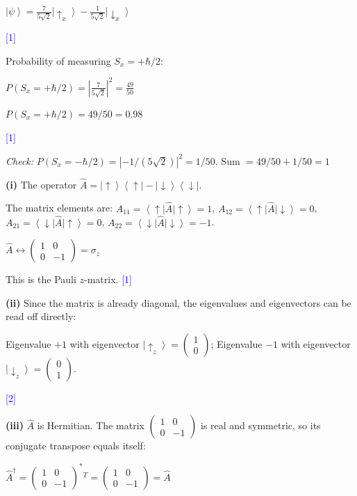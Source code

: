 \documentclass[12pt,a4paper]{article}
\newcommand{\markstep}[1]{\hfill\textcolor{blue}{[#1]}}
\newcommand{\finalanswer}[1]{%
  \begin{tcolorbox}[colback=green!5!white,colframe=green!50!black,boxrule=0.5pt]
  #1
  \end{tcolorbox}
}
\renewcommand{\ket}[1]{\left|#1\right\rangle}
\renewcommand{\bra}[1]{\left\langle #1\right|}
\renewcommand{\ketbra}[2]{\left|#1\right\rangle\!\left\langle #2\right|}
\begin{document}
\begin{parts}
\finalanswer{$\ket{\psi} = \frac{7}{5\sqrt{2}}\ket{\!\uparrow_x} - \frac{1}{5\sqrt{2}}\ket{\!\downarrow_x}$} \markstep{1}

Probability of measuring $S_x = +\hbar/2$:

$P(S_x = +\hbar/2) = \left|\frac{7}{5\sqrt{2}}\right|^2 = \frac{49}{50}$

\finalanswer{$P(S_x = +\hbar/2) = 49/50 = 0.98$} \markstep{1}

\textit{Check:} $P(S_x = -\hbar/2) = |{-1}/(5\sqrt{2})|^2 = 1/50$. Sum $= 49/50 + 1/50 = 1$ \checkmark

\item

\textbf{(i)} The operator $\hat{A} = \ketbra{\!\uparrow}{\uparrow\!} - \ketbra{\!\downarrow}{\downarrow\!}$.

The matrix elements are: $A_{11} = \bra{\!\uparrow}\hat{A}\ket{\!\uparrow} = 1$, $A_{12} = \bra{\!\uparrow}\hat{A}\ket{\!\downarrow} = 0$, $A_{21} = \bra{\!\downarrow}\hat{A}\ket{\!\uparrow} = 0$, $A_{22} = \bra{\!\downarrow}\hat{A}\ket{\!\downarrow} = -1$.

\finalanswer{$\hat{A} \leftrightarrow \begin{pmatrix} 1 & 0 \\ 0 & -1 \end{pmatrix} = \sigma_z$}

This is the Pauli $z$-matrix. \markstep{1}

\textbf{(ii)} Since the matrix is already diagonal, the eigenvalues and eigenvectors can be read off directly:

\finalanswer{Eigenvalue $+1$ with eigenvector $\ket{\!\uparrow_z} = \begin{pmatrix}1\\0\end{pmatrix}$; \quad Eigenvalue $-1$ with eigenvector $\ket{\!\downarrow_z} = \begin{pmatrix}0\\1\end{pmatrix}$.} \markstep{2}

\textbf{(iii)} $\hat{A}$ is Hermitian. The matrix $\begin{pmatrix}1&0\\0&-1\end{pmatrix}$ is real and symmetric, so its conjugate transpose equals itself:

$\hat{A}^\dagger = \begin{pmatrix}1&0\\0&-1\end{pmatrix}^* {}^T = \begin{pmatrix}1&0\\0&-1\end{pmatrix} = \hat{A}$


\end{parts}
\end{document}
